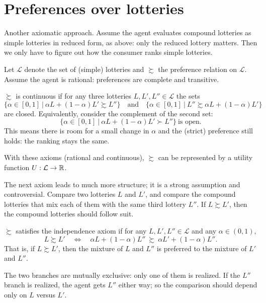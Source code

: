 \documentclass[11pt]{article}
\begin{document}
\section{Preferences over lotteries}

Another axiomatic approach. Assume the agent evaluates compound lotteries as simple
lotteries in reduced form, as above: only the reduced lottery matters. Then we only
have to figure out how the consumer ranks simple lotteries.

Let $\mathcal{L}$ denote the set of (simple) lotteries and $\succsim$ the preference
relation on $\mathcal{L}$. Assume the agent is rational: preferences are complete and
transitive.

$\succsim$ is continuous if for any three lotteries $L,L',L''\in\mathcal{L}$ the sets
\[ \bigl\{\alpha\in[0,1]\ \big|\ \alpha L+(1-\alpha)L'\succsim L''\bigr\}
   \quad\text{and}\quad
   \bigl\{\alpha\in[0,1]\ \big|\ L''\succsim\alpha L+(1-\alpha)L'\bigr\} \]
are closed. Equivalently, consider the complement of the second set:
\[ \bigl\{\alpha\in[0,1]\ \big|\ \alpha L+(1-\alpha)L'\succ L''\bigr\}
   \ \text{is open}. \]
This means there is room for a small change in $\alpha$ and the (strict) preference
still holds: the ranking stays the same.

With these axioms (rational and continuous), $\succsim$ can be represented by a utility
function $U:\mathcal{L}\to\mathbb{R}$.

The next axiom leads to much more structure; it is a strong assumption and
controversial. Compare two lotteries $L$ and $L'$, and compare the compound lotteries
that mix each of them with the same third lottery $L''$. If $L\succsim L'$, then the
compound lotteries should follow suit.

$\succsim$ satisfies the independence axiom if for any $L,L',L''\in\mathcal{L}$ and
any $\alpha\in(0,1)$,
\[ L\succsim L' \quad\Longleftrightarrow\quad
   \alpha L+(1-\alpha)L''\ \succsim\ \alpha L'+(1-\alpha)L''. \]
That is, if $L\succsim L'$, then the mixture of $L$ and $L''$ is preferred to the
mixture of $L'$ and $L''$.

\begin{center}
\end{center}
The two branches are mutually exclusive: only one of them is realized. If the
$L''$ branch is realized, the agent gets $L''$ either way; so the comparison should
depend only on $L$ versus $L'$.
\end{document}
